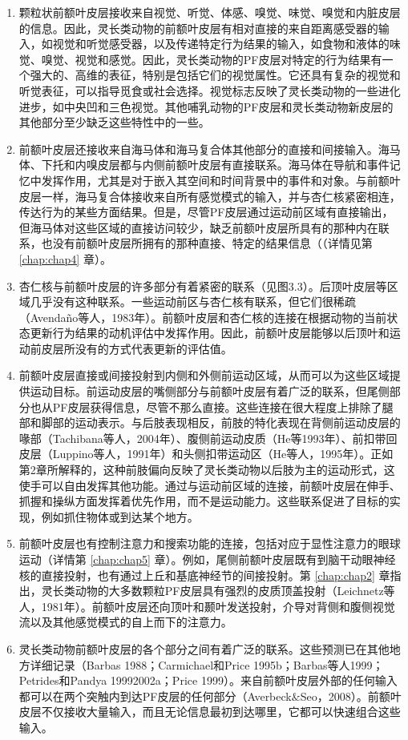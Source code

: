 \begin{enumerate}
\item 颗粒状前额叶皮层接收来自视觉、听觉、体感、嗅觉、味觉、嗅觉和内脏皮层的信息。因此，灵长类动物的前额叶皮层有相对直接的来自距离感受器的输入，如视觉和听觉感受器，以及传递特定行为结果的输入，如食物和液体的味觉、嗅觉、视觉和感觉。因此，灵长类动物的PF皮层对特定的行为结果有一个强大的、高维的表征，特别是包括它们的视觉属性。它还具有复杂的视觉和听觉表征，可以指导觅食或社会选择。视觉标志反映了灵长类动物的一些进化进步，如中央凹和三色视觉。其他哺乳动物的PF皮层和灵长类动物新皮层的其他部分至少缺乏这些特性中的一些。

\item 前额叶皮层还接收来自海马体和海马复合体其他部分的直接和间接输入。海马体、下托和内嗅皮层都与内侧前额叶皮层有直接联系。海马体在导航和事件记忆中发挥作用，尤其是对于嵌入其空间和时间背景中的事件和对象。与前额叶皮层一样，海马复合体接收来自所有感觉模式的输入，并与杏仁核紧密相连，传达行为的某些方面结果。但是，尽管PF皮层通过运动前区域有直接输出，但海马体对这些区域的直接访问较少，缺乏前额叶皮层所具有的那种内在联系，也没有前额叶皮层所拥有的那种直接、特定的结果信息（（详情见第 \ref{chap:chap4} 章）。


\item 杏仁核与前额叶皮层的许多部分有着紧密的联系（见图3.3）。后顶叶皮层等区域几乎没有这种联系。一些运动前区与杏仁核有联系，但它们很稀疏（Avendaño等人，1983年）。前额叶皮层和杏仁核的连接在根据动物的当前状态更新行为结果的动机评估中发挥作用。因此，前额叶皮层能够以后顶叶和运动前皮层所没有的方式代表更新的评估值。

\item 前额叶皮层直接或间接投射到内侧和外侧前运动区域，从而可以为这些区域提供运动目标。前运动皮层的嘴侧部分与前额叶皮层有着广泛的联系，但尾侧部分也从PF皮层获得信息，尽管不那么直接。这些连接在很大程度上排除了腿部和脚部的运动表示。与后肢表现相反，前肢的特化表现在背侧前运动皮层的喙部（Tachibana等人，2004年）、腹侧前运动皮质（He等1993年）、前扣带回皮层（Luppino等人，1991年）和头侧扣带运动区（He等人，1995年）。正如第2章所解释的，这种前肢偏向反映了灵长类动物以后肢为主的运动形式，这使手可以自由发挥其他功能。通过与运动前区域的连接，前额叶皮层在伸手、抓握和操纵方面发挥着优先作用，而不是运动能力。这些联系促进了目标的实现，例如抓住物体或到达某个地方。

\item 前额叶皮层也有控制注意力和搜索功能的连接，包括对应于显性注意力的眼球运动（详情第 \ref{chap:chap5} 章）。例如，尾侧前额叶皮层既有到脑干动眼神经核的直接投射，也有通过上丘和基底神经节的间接投射。第 \ref{chap:chap2} 章指出，灵长类动物的大多数颗粒PF皮层具有强烈的皮质顶盖投射（Leichnetz等人，1981年）。前额叶皮层还向顶叶和颞叶发送投射，介导对背侧和腹侧视觉流以及其他感觉模式的自上而下的注意力。

\item 灵长类动物前额叶皮层的各个部分之间有着广泛的联系。这些预测已在其他地方详细记录（Barbas 1988；Carmichael和Price 1995b；Barbas等人1999；Petrides和Pandya 19992002a；Price 1999）。来自前额叶皮层外部的任何输入都可以在两个突触内到达PF皮层的任何部分（Averbeck$\&$Seo，2008）。前额叶皮层不仅接收大量输入，而且无论信息最初到达哪里，它都可以快速组合这些输入。
\end{enumerate}
\par


